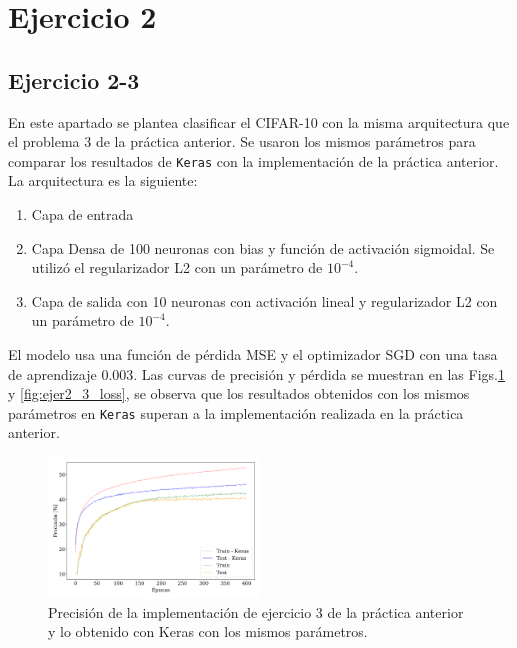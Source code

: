 \section*{Ejercicio 2}

\subsection*{Ejercicio 2-3}
    En este apartado se plantea clasificar el CIFAR-10 con la misma arquitectura que el problema 3 de la práctica anterior. Se usaron los mismos parámetros para comparar los resultados de \verb|Keras| con la implementación de la práctica anterior. La arquitectura es la siguiente:

    \begin{enumerate}
        \item Capa de entrada
        \item Capa Densa de 100 neuronas con bias y función de activación sigmoidal. Se utilizó el regularizador L2 con un parámetro de $10^{-4}$.
        \item Capa de salida con 10 neuronas con activación lineal y  regularizador L2 con un parámetro de $10^{-4}$.
    \end{enumerate}

    El modelo usa una función de pérdida MSE y el optimizador SGD con una tasa de aprendizaje 0.003. Las curvas de precisión y pérdida se muestran en las Figs.\ref{fig:ejer2_3_acc} y \ref{fig:ejer2_3_loss}, se observa que los resultados obtenidos con los mismos parámetros en \verb|Keras| superan a la implementación realizada en la práctica anterior.


    \begin{figure}[H]
        \begin{small}
            \begin{center}
                \includegraphics[width=0.5\textwidth]{Graphs/ejer2_3_acc.pdf}
            \end{center}
            \caption{Precisión de la implementación de ejercicio 3 de la práctica anterior y lo obtenido con Keras con los mismos parámetros.}
            \label{fig:ejer2_3_acc}
        \end{small}
    \end{figure}


